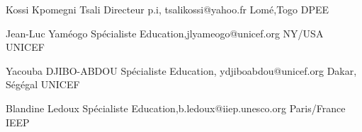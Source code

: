 

\begin{cvhonors}

  \cvhonor
    {Kossi Kpomegni Tsali} %
    {Directeur p.i, tsalikossi@yahoo.fr} %
    {Lomé,Togo}%
    {DPEE} %

  \cvhonor
    {Jean-Luc Yaméogo} %
    {Spécialiste Education,jlyameogo@unicef.org} %
    {NY/USA} %
    {UNICEF} %

  \cvhonor
    {Yacouba DJIBO-ABDOU} %
    {Spécialiste Education, ydjiboabdou@unicef.org} %
    {Dakar, Ségégal} %
    {UNICEF} %

  \cvhonor
    {Blandine Ledoux} %
    {Spécialiste Education,b.ledoux@iiep.unesco.org } %
    {Paris/France} %
    {IEEP} %

\end{cvhonors}
